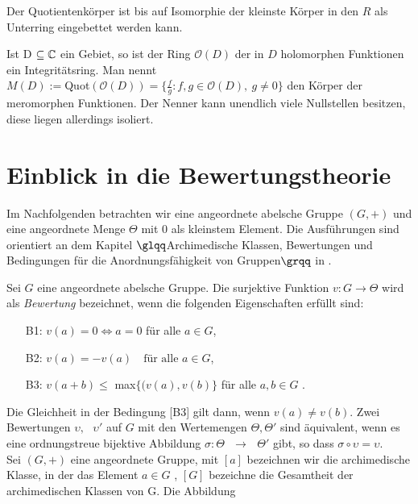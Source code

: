 %
%
% 
%
%
\begin{bem}
Der Quotientenkörper ist bis auf Isomorphie der kleinste Körper in den $R$ als Unterring eingebettet werden kann.
\end{bem}
%
%
%
%
%
%
%
\begin{bsp}
Ist D $\subseteq \mathbb{C}$ ein Gebiet, so ist der Ring $ \mathcal{O} (D) $ der in $D$ holomorphen Funktionen ein Integritätsring. Man nennt \\
$ M \left(D\right) := $Quot$\left( \mathcal{O} \left( D \right)\right) = \lbrace \frac{f}{g}: f,g \in \mathcal{O} (D), ~g \neq 0\rbrace$ den Körper der meromorphen Funktionen. Der Nenner kann unendlich viele Nullstellen besitzen, diese liegen allerdings isoliert. 
\end{bsp}
%
\section{Einblick in die Bewertungstheorie}
Im Nachfolgenden betrachten wir eine angeordnete abelsche Gruppe $\left(G,+\right)$ und eine angeordnete Menge $\Theta$ mit $0$ als kleinstem Element. Die Ausführungen sind orientiert an dem Kapitel $\glqq$Archimedische Klassen, Bewertungen und Bedingungen für die Anordnungsfähigkeit von Gruppen$\grqq$ in \cite[S. 9 - 11]{priesscrampe83}.
%
%
\begin{defn} %
Sei $G$ eine angeordnete abelsche Gruppe. Die surjektive Funktion $v\colon G \rightarrow \Theta$ wird als \textit{Bewertung} bezeichnet, wenn die folgenden Eigenschaften erfüllt sind:
%
\begin{enumerate}
\item[B1:] $v{(a)} = 0 \Leftrightarrow a = 0$ für alle $a\in G$,
\item[B2:]  $v{(a)} = -v{(a)} \text{  } \text{ für alle } a \in G $,
\item[B3:] $ v{(a+ b)} \le$ max$\{(v{(a)}, v{(b)}\}$ für alle $ a, b \in G$ .
\end{enumerate}
%
\end{defn}
Die Gleichheit in der Bedingung [B3] gilt dann, wenn $v{(a)} \ne v{(b)} $. Zwei Bewertungen $\upsilon, \text{ } \upsilon' $ auf $G$ mit den Wertemengen $\Theta , \Theta' $ sind äquivalent, wenn es eine ordnungstreue bijektive Abbildung $\sigma \colon \Theta \text{ } \rightarrow \text{ } \Theta' $ gibt, so dass $ \sigma \circ \upsilon = \upsilon  $.\\
Sei $\left(G, +\right)$ eine angeordnete Gruppe, mit $[a]$ bezeichnen wir die archimedische Klasse, in der das Element $a\in G$ , $[G]$ bezeichne die Gesamtheit der archimedischen Klassen von G. Die Abbildung 
